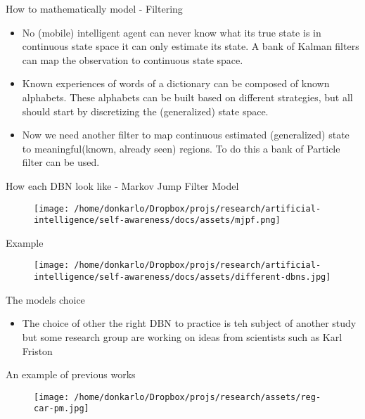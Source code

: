 \documentclass[unknownkeysallowed]{beamer}
\begin{document}
\begin{frame}{How to mathematically model - Filtering}
	\begin{itemize}
		\item No (mobile) intelligent agent can never know what its true state is in continuous state space it can only estimate its state.  A bank of Kalman filters can map the observation to continuous state space.
		\item Known experiences of words of a dictionary can be composed of known alphabets. These alphabets can be built based on different strategies, but all should start by discretizing the (generalized) state space.
		\item Now we need another filter to map continuous estimated (generalized) state to meaningful(known, already seen) regions. To do this a bank of Particle filter can be used.   
	\end{itemize}
\end{frame}

\begin{frame}{How each DBN look like - Markov Jump Filter Model}
	\begin{figure}
		\texttt{[image: /home/donkarlo/Dropbox/projs/research/artificial-intelligence/self-awareness/docs/assets/mjpf.png]}
		\caption{}
	\end{figure}
\end{frame}

\begin{frame}{Example}
	\begin{figure}
		\texttt{[image: /home/donkarlo/Dropbox/projs/research/artificial-intelligence/self-awareness/docs/assets/different-dbns.jpg]}
		\caption{}
	\end{figure}
\end{frame}


\begin{frame}{The models choice}
	\begin{itemize}
		\item The choice of other the right DBN to practice is teh subject of another study but some research group are working on ideas from scientists such as Karl Friston
	\end{itemize}
\end{frame}

\begin{frame}{An example of previous works}
	\begin{figure}
		\texttt{[image: /home/donkarlo/Dropbox/projs/research/assets/reg-car-pm.jpg]}
		\caption{}
	\end{figure}
\end{frame}
\end{document}

